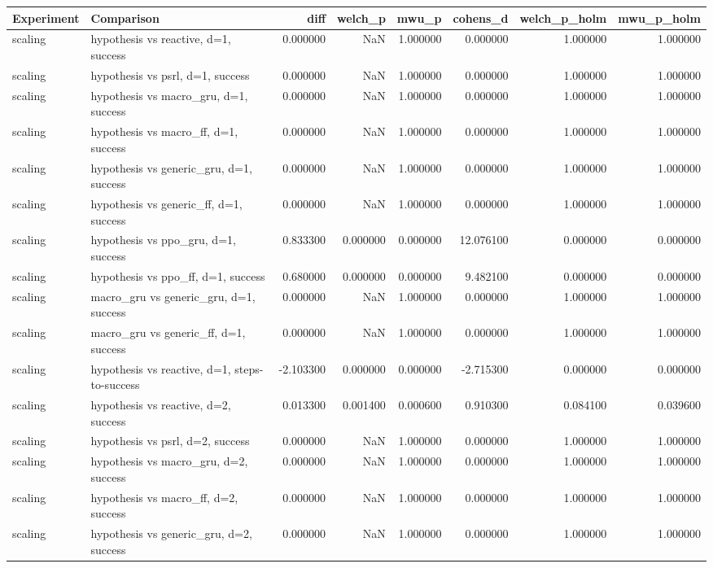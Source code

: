 \begin{tabular}{llrrrrrr}
\toprule
Experiment & Comparison & diff & welch\_p & mwu\_p & cohens\_d & welch\_p\_holm & mwu\_p\_holm \\
\midrule
scaling & hypothesis vs reactive, d=1, success & 0.000000 & NaN & 1.000000 & 0.000000 & 1.000000 & 1.000000 \\
scaling & hypothesis vs psrl, d=1, success & 0.000000 & NaN & 1.000000 & 0.000000 & 1.000000 & 1.000000 \\
scaling & hypothesis vs macro\_gru, d=1, success & 0.000000 & NaN & 1.000000 & 0.000000 & 1.000000 & 1.000000 \\
scaling & hypothesis vs macro\_ff, d=1, success & 0.000000 & NaN & 1.000000 & 0.000000 & 1.000000 & 1.000000 \\
scaling & hypothesis vs generic\_gru, d=1, success & 0.000000 & NaN & 1.000000 & 0.000000 & 1.000000 & 1.000000 \\
scaling & hypothesis vs generic\_ff, d=1, success & 0.000000 & NaN & 1.000000 & 0.000000 & 1.000000 & 1.000000 \\
scaling & hypothesis vs ppo\_gru, d=1, success & 0.833300 & 0.000000 & 0.000000 & 12.076100 & 0.000000 & 0.000000 \\
scaling & hypothesis vs ppo\_ff, d=1, success & 0.680000 & 0.000000 & 0.000000 & 9.482100 & 0.000000 & 0.000000 \\
scaling & macro\_gru vs generic\_gru, d=1, success & 0.000000 & NaN & 1.000000 & 0.000000 & 1.000000 & 1.000000 \\
scaling & macro\_gru vs generic\_ff, d=1, success & 0.000000 & NaN & 1.000000 & 0.000000 & 1.000000 & 1.000000 \\
scaling & hypothesis vs reactive, d=1, steps-to-success & -2.103300 & 0.000000 & 0.000000 & -2.715300 & 0.000000 & 0.000000 \\
scaling & hypothesis vs reactive, d=2, success & 0.013300 & 0.001400 & 0.000600 & 0.910300 & 0.084100 & 0.039600 \\
scaling & hypothesis vs psrl, d=2, success & 0.000000 & NaN & 1.000000 & 0.000000 & 1.000000 & 1.000000 \\
scaling & hypothesis vs macro\_gru, d=2, success & 0.000000 & NaN & 1.000000 & 0.000000 & 1.000000 & 1.000000 \\
scaling & hypothesis vs macro\_ff, d=2, success & 0.000000 & NaN & 1.000000 & 0.000000 & 1.000000 & 1.000000 \\
scaling & hypothesis vs generic\_gru, d=2, success & 0.000000 & NaN & 1.000000 & 0.000000 & 1.000000 & 1.000000 \\

\end{tabular}

